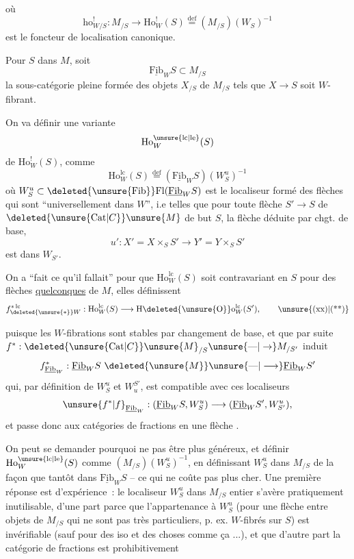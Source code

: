 où
\[
\mathrm{ho}^{!}_{W/S}:M_{/S}\longrightarrow\mathrm{Ho}^{!}_W(S)\overset{\mathrm{def}}{=}(M_{/S})(W_S)^{-1}
\]
est le foncteur de localisation canonique.

Pour  $S$ dans $M$, soit
\[
\underline{\mathrm{Fib}}_W S\subset M_{/S}
\]
la sous-catégorie pleine formée des objets $X_{/S}$ de $M_{/S}$ tels que $X\to S$ soit $W$-fibrant.

On va définir une variante
\[
\mathrm{Ho}^{\unsure{\mathrm{lc}|\mathrm{le}}}_W(S)
\]
 de $\mathrm{Ho}^{!}_W(S)$, comme
\[
\mathrm{Ho}^{\mathrm{lc}}_W(S)\overset{\mathrm{def}}{=}(\underline{\mathrm{Fib}}_W S)(W_S^{u})^{-1}
\]
où $W_S^{u}\subset\deleted{\unsure{\mathrm{Fib}}}\mathrm{Fl}(\underline{\mathrm{Fib}}_W S)$ est le localiseur formé des flèches  qui sont ``universellement  dans $W$'', i.e telles que pour toute flèche $S'\to S$ de $\deleted{\unsure{\mathrm{Cat}|C}}\unsure{M}$ de but $S$, la flèche déduite par chgt. de base,
\[
u':X'=X\times_S S'\longrightarrow Y'=Y\times_S S'
\]
est dans $W_{S'}$.

On a ``fait ce qu'il fallait'' pour que $\mathrm{Ho}^{\mathrm{lc}}_W(S)$ soit contravariant en $S$ pour des flèches \uline{quelconques}  de $M$, elles définissent
\[
f_{\deleted{\unsure{*}}W}^{*\,\mathrm{lc}}:\mathrm{Ho}^{\mathrm{lc}}_W(S)\longrightarrow \mathrm{H}\deleted{\unsure{\mathrm{O}}}\mathrm{o}^{\mathrm{lc}}_W(S'),\tag*{\unsure{(xx)|(**)}}
\]

puisque les $W$-fibrations sont stables par changement de base, et que par suite $f^*: \deleted{\unsure{\mathrm{Cat}|C}}\unsure{M}_{/S}\unsure{\text{---}|\to}M_{/S'}$ induit
\[
f^*_{\underline{\mathrm{Fib}}_W}:\underline{\mathrm{Fib}}_W S\ \deleted{\unsure{M}}\unsure{\text{---}|\longrightarrow}\underline{\mathrm{Fib}}_W S'
\]
qui, par définition de $W_S^u$ et $W_u^{S'}$, est compatible avec ces localiseurs
\[
\unsure{f^{*}|f}_{\underline{\mathrm{Fib}}_W}:(\underline{\mathrm{Fib}}_W S,W_S^u)\longrightarrow(\underline{\mathrm{Fib}}_W S',W_{S'}^u),
\]
et passe donc aux catégories de fractions en une flèche .

On peut se demander pourquoi ne pas être plus généreux, et définir $\mathrm{Ho}^{\unsure{\mathrm{lc}|\mathrm{le}}}_W(S)$ comme $(M_{/S})(W_S^u)^{-1}$, en définissant $W_S^u$ dans $M_{/S}$ de la  façon que tantôt dans $\underline{\mathrm{Fib}}_W S$ -- ce qui ne coûte pas plus cher. Une première réponse est d'expérience~: le localiseur $W_S^u$ dans $M_{/S}$  entier s'avère pratiquement inutilisable, d'une part parce que l'appartenance à $W_S^u$ (pour une flèche entre objets de $M_{/S}$ qui ne sont pas très particuliers, p. ex. $W$-fibrés sur $S$) est  invérifiable (sauf pour des iso et des choses comme ça ...), et que d'autre part la catégorie de fractions est prohibitivement


